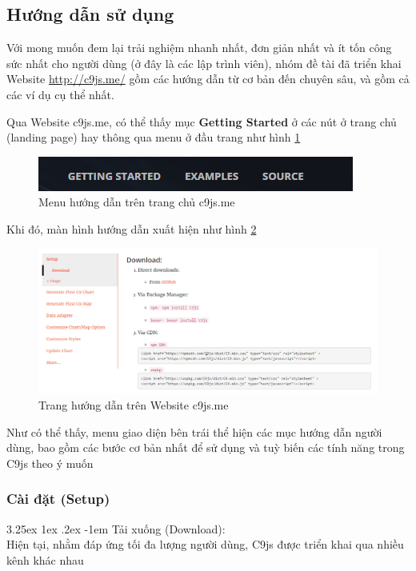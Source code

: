 \documentclass[12pt,a4paper]{article}
\makeatletter
\newcommand{\myparagraph}[1]{\paragraph{#1}\mbox{}\\} %
\renewcommand\paragraph{\@startsection{paragraph}{5}{\z@}%
  {3.25ex \@plus1ex \@minus.2ex}%
  {-1em}%
  {\normalfont\normalsize\bfseries}}
\makeatother
\begin{document}
\subsection{Hướng dẫn sử dụng}
Với mong muốn đem lại trải nghiệm nhanh nhất, đơn giản nhất và ít tốn công sức nhất cho người dùng (ở đây là các lập trình viên), nhóm đề tài đã triển khai Website \url{http://c9js.me/} gồm các hướng dẫn từ cơ bản đến chuyên sâu, và gồm cả các ví dụ cụ thể nhất. 

Qua Website c9js.me, có thể thấy mục \textbf{Getting Started} ở các nút ở trang chủ (landing page) hay thông qua menu ở đầu trang như hình \ref{fig:getting_started}

\begin{figure}[htp]
	\begin{center}
    \includegraphics[scale=.8]{image/getting_started}
    \caption{Menu hướng dẫn trên trang chủ c9js.me}
    \label{fig:getting_started}
	\end{center}
\end{figure}

Khi đó, màn hình hướng dẫn xuất hiện như hình \ref{fig:gs_1}
\begin{figure}[htp]
	\begin{center}
    \includegraphics[scale=.5]{image/gs_1}
    \caption{Trang hướng dẫn trên Website c9js.me}
    \label{fig:gs_1}
	\end{center}
\end{figure}

Như có thể thấy, menu giao diện bên trái thể hiện các mục hướng dẫn người dùng, bao gồm các bước cơ bản nhất để sử dụng và tuỳ biến các tính năng trong C9js theo ý muốn

\subsubsection{Cài đặt (Setup)}
\myparagraph{Tải xuống (Download):}
Hiện tại, nhằm đáp ứng tối đa lượng người dùng, C9js được triển khai qua nhiều kênh khác nhau
\end{document}
